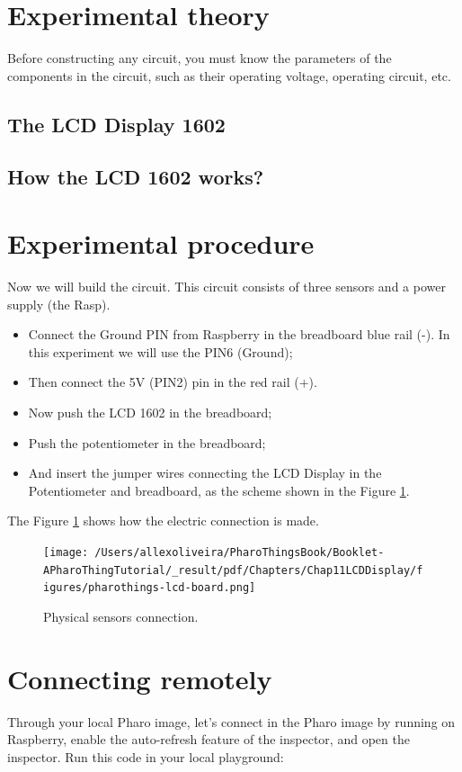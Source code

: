 \documentclass[10pt,twoside,english]{_support/latex/sbabook/sbabook}
\begin{document}
\section{Experimental theory}
Before constructing any circuit, you must know the parameters of the components in the circuit, such as their operating voltage, operating circuit, etc.
\subsection{The LCD Display 1602}\subsection{How the LCD 1602 works?}\section{Experimental procedure}
Now we will build the circuit. This circuit consists of three sensors and a power supply (the Rasp).

\begin{itemize}
\item Connect the Ground PIN from Raspberry in the breadboard blue rail (-). In this experiment we will use the PIN6 (Ground);
\item Then connect the 5V (PIN2) pin in the red rail (+). 
\item Now push the LCD 1602 in the breadboard;
\item Push the potentiometer in the breadboard;
\item And insert the jumper wires connecting the LCD Display in the Potentiometer and breadboard, as the scheme shown in the Figure \ref{physicalLCD}.
\end{itemize}

The Figure \ref{physicalLCD} shows how the electric connection is made.


\begin{figure}

\begin{center}
\texttt{[image: /Users/allexoliveira/PharoThingsBook/Booklet-APharoThingTutorial/\_result/pdf/Chapters/Chap11LCDDisplay/figures/pharothings-lcd-board.png]}\caption{Physical sensors connection.\label{physicalLCD}}\end{center}
\end{figure}

\section{Connecting remotely}
Through your local Pharo image, let’s connect in the Pharo image by running on Raspberry, enable the auto-refresh feature of the inspector, and open the inspector.
Run this code in your local playground:
\end{document}
